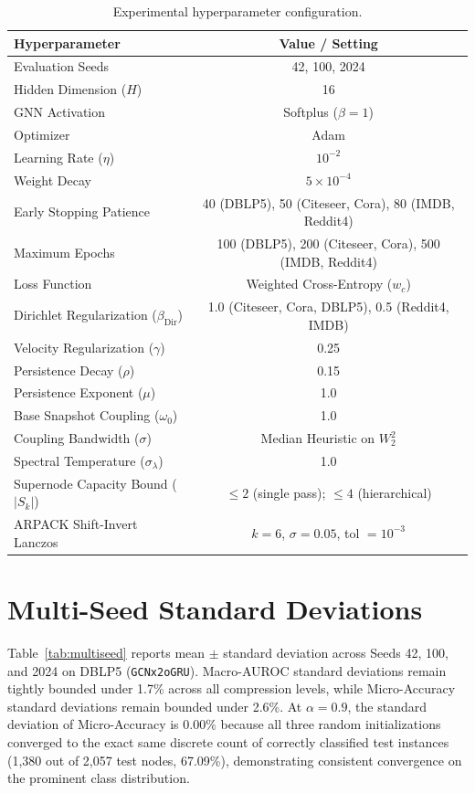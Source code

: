 \documentclass[sigconf]{acmart}
\begin{document}
\begin{table}[t]
\centering
\caption{Experimental hyperparameter configuration.}
\label{tab:hyperparams}
\small
\begin{tabular*}{\columnwidth}{@{\extracolsep{\fill}}lc@{}}
\toprule
\textbf{Hyperparameter} & \textbf{Value / Setting} \\
\midrule
Evaluation Seeds & 42, 100, 2024 \\
Hidden Dimension ($H$) & 16 \\
GNN Activation & Softplus ($\beta = 1$) \\
Optimizer & Adam \\
Learning Rate ($\eta$) & $10^{-2}$ \\
Weight Decay & $5 \times 10^{-4}$ \\
Early Stopping Patience & 40 (DBLP5), 50 (Citeseer, Cora), 80 (IMDB, Reddit4) \\
Maximum Epochs & 100 (DBLP5), 200 (Citeseer, Cora), 500 (IMDB, Reddit4) \\
Loss Function & Weighted Cross-Entropy ($w_c$) \\
Dirichlet Regularization ($\beta_{\text{Dir}}$) & 1.0 (Citeseer, Cora, DBLP5), 0.5 (Reddit4, IMDB) \\
Velocity Regularization ($\gamma$) & 0.25 \\
Persistence Decay ($\rho$) & 0.15 \\
Persistence Exponent ($\mu$) & 1.0 \\
Base Snapshot Coupling ($\omega_0$) & 1.0 \\
Coupling Bandwidth ($\sigma$) & Median Heuristic on $W_2^2$ \\
Spectral Temperature ($\sigma_\lambda$) & 1.0 \\
Supernode Capacity Bound ($|S_k|$) & $\le 2$ (single pass); $\le 4$ (hierarchical) \\
ARPACK Shift-Invert Lanczos & $k = 6$, $\sigma = 0.05$, tol $= 10^{-3}$ \\
\bottomrule
\end{tabular*}
\end{table}

\section{Multi-Seed Standard Deviations}
\label{app:seeds}
Table~\ref{tab:multiseed} reports mean $\pm$ standard deviation across Seeds 42, 100, and 2024 on DBLP5 (\texttt{GCNx2oGRU}). Macro-AUROC standard deviations remain tightly bounded under 1.7\% across all compression levels, while Micro-Accuracy standard deviations remain bounded under 2.6\%. At $\alpha=0.9$, the standard deviation of Micro-Accuracy is $0.00\%$ because all three random initializations converged to the exact same discrete count of correctly classified test instances (1,380 out of 2,057 test nodes, 67.09\%), demonstrating consistent convergence on the prominent class distribution.
\end{document}
